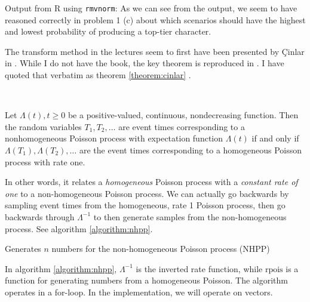 \documentclass[a4paper,english,12pt]{article}
\begin{document}
Output from R using \texttt{rmvnorm}:
As we can see from the output, we seem to have reasoned correctly in problem 1
(c) about which scenarios should have the highest and lowest probability of
producing a top-tier character.

\clearpage
{}
The transform method in the lectures seem to first have been presented by
Çinlar in \cite[p.~96]{cinlar}. While I do not have the book, the key theorem 
is reproduced in \cite{generating}. I have quoted that verbatim as
theorem \ref{theorem:cinlar} .

~\begin{theorem}
  \label{theorem:cinlar}
  Let $\Lambda(t), t \geqslant 0$ be a positive-valued, continuous,
  nondecreasing function. Then the random variables $T_1, T_2, \dots$ are event
  times corresponding to a nonhomogeneous Poisson process with expectation
  function $\Lambda(t)$ if and only if $\Lambda(T_1), \Lambda(T_2), \dots$ are
  the event times corresponding to a homogeneous Poisson process with rate one.
\end{theorem}

In other words, it relates a \textit{homogeneous} Poisson process with a
\textit{constant rate of one} to a non-homogeneous Poisson process. We can
actually go backwards by sampling event times from the homogeneous, rate 1
Poisson process, then go backwards through $\Lambda^{-1}$ to then generate
samples from the non-homogeneous process. See algorithm \vref{algorithm:nhpp}.

\begin{algorithm}
  \caption{Generates $n$ numbers for the non-homogeneous Poisson process (NHPP)}
  \label{algorithm:nhpp}
  \begin{algorithmic}[1]
         
      \EndFor
      \State {}
    \EndFunction
  \end{algorithmic}
\end{algorithm}

In algorithm \vref{algorithm:nhpp}, $\Lambda^{-1}$ is the inverted rate
function, while $\textrm{rpois}$ is a function for generating numbers from a
homogeneous Poisson. The algorithm operates in a for-loop. In the
implementation, we will operate on vectors.
\end{document}
